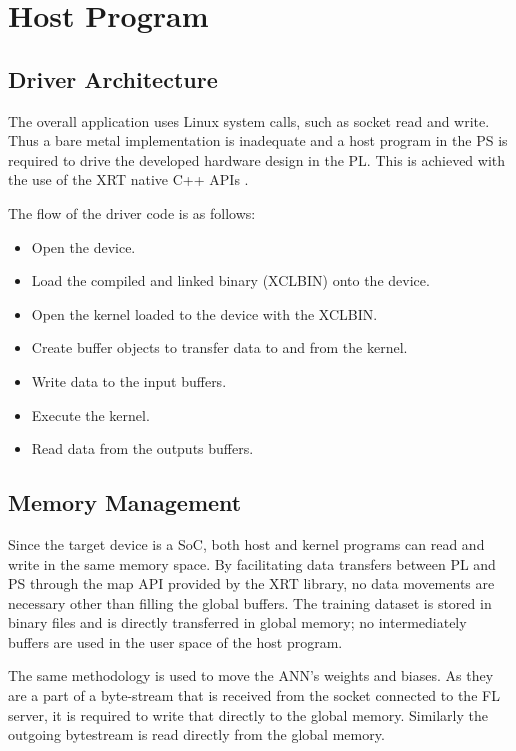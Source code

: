 \section{Host Program}
\label{sec:host_program}
\subsection{Driver Architecture}
The overall application uses Linux system calls, such as socket read and write. Thus a bare metal implementation is inadequate and a host program in the PS is required to drive the developed hardware design in the PL. This is achieved with the use of the XRT native C++ APIs \cite{XRT_Native_APIs}.

The flow of the driver code is as follows:
\begin{itemize}
    \item Open the device.
    \item Load the compiled and linked binary (XCLBIN) onto the device.
    \item Open the kernel loaded to the device with the XCLBIN.
    \item Create buffer objects to transfer data to and from the kernel.
    \item Write data to the input buffers.
    \item Execute the kernel.
    \item Read data from the outputs buffers.
\end{itemize}

\subsection{Memory Management}
Since the target device is a SoC, both host and kernel programs can read and write in the same memory space. By facilitating data transfers between PL and PS through the map API provided by the XRT library, no data movements are necessary other than filling the global buffers. The training dataset is stored in binary files and is directly transferred in global memory; no intermediately buffers are used in the user space of the host program. %

The same methodology is used to move the ANN's weights and biases. As they are a part of a byte-stream that is received from the socket connected to the FL server, it is required to write that directly to the global memory. Similarly the outgoing bytestream is read directly from the global memory. %


